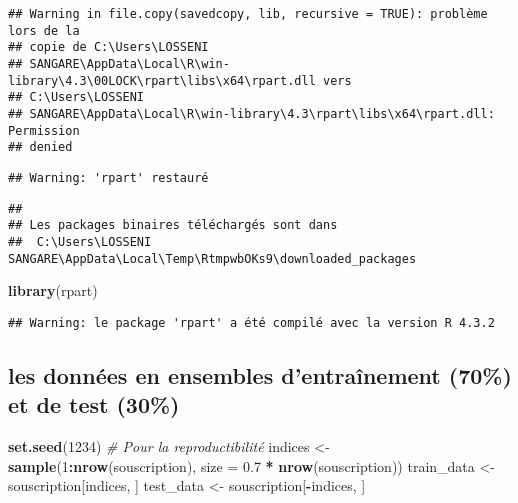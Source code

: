 \documentclass[
]{article}
\newenvironment{Shaded}{\begin{snugshade}}{\end{snugshade}}
\newcommand{\AttributeTok}[1]{\textcolor[rgb]{0.13,0.29,0.53}{#1}}
\newcommand{\CommentTok}[1]{\textcolor[rgb]{0.56,0.35,0.01}{\textit{#1}}}
\newcommand{\DecValTok}[1]{\textcolor[rgb]{0.00,0.00,0.81}{#1}}
\newcommand{\FloatTok}[1]{\textcolor[rgb]{0.00,0.00,0.81}{#1}}
\newcommand{\FunctionTok}[1]{\textcolor[rgb]{0.13,0.29,0.53}{\textbf{#1}}}
\newcommand{\NormalTok}[1]{#1}
\newcommand{\OtherTok}[1]{\textcolor[rgb]{0.56,0.35,0.01}{#1}}
\newcommand{\SpecialCharTok}[1]{\textcolor[rgb]{0.81,0.36,0.00}{\textbf{#1}}}
\begin{document}
\begin{verbatim}
## Warning in file.copy(savedcopy, lib, recursive = TRUE): problème lors de la
## copie de C:\Users\LOSSENI
## SANGARE\AppData\Local\R\win-library\4.3\00LOCK\rpart\libs\x64\rpart.dll vers
## C:\Users\LOSSENI
## SANGARE\AppData\Local\R\win-library\4.3\rpart\libs\x64\rpart.dll: Permission
## denied
\end{verbatim}

\begin{verbatim}
## Warning: 'rpart' restauré
\end{verbatim}

\begin{verbatim}
## 
## Les packages binaires téléchargés sont dans
##  C:\Users\LOSSENI SANGARE\AppData\Local\Temp\RtmpwbOKs9\downloaded_packages
\end{verbatim}

\begin{Shaded}
\begin{Highlighting}[]
\FunctionTok{library}\NormalTok{(rpart)}
\end{Highlighting}
\end{Shaded}

\begin{verbatim}
## Warning: le package 'rpart' a été compilé avec la version R 4.3.2
\end{verbatim}

\hypertarget{les-donnuxe9es-en-ensembles-dentrauxeenement-70-et-de-test-30}{%
\subsection{les données en ensembles d'entraînement (70\%) et de test
(30\%)}\label{les-donnuxe9es-en-ensembles-dentrauxeenement-70-et-de-test-30}}

\begin{Shaded}
\begin{Highlighting}[]
  \FunctionTok{set.seed}\NormalTok{(}\DecValTok{1234}\NormalTok{)  }\CommentTok{\# Pour la reproductibilité}
\NormalTok{  indices }\OtherTok{\textless{}{-}} \FunctionTok{sample}\NormalTok{(}\DecValTok{1}\SpecialCharTok{:}\FunctionTok{nrow}\NormalTok{(souscription), }\AttributeTok{size =} \FloatTok{0.7} \SpecialCharTok{*} \FunctionTok{nrow}\NormalTok{(souscription))}
\NormalTok{  train\_data }\OtherTok{\textless{}{-}}\NormalTok{ souscription[indices, ]}
\NormalTok{  test\_data }\OtherTok{\textless{}{-}}\NormalTok{ souscription[}\SpecialCharTok{{-}}\NormalTok{indices, ]}
\end{Highlighting}
\end{Shaded}
\end{document}
